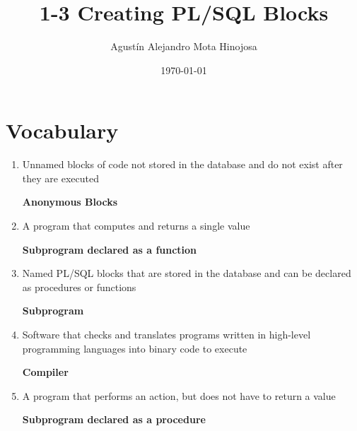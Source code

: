 \documentclass[11pt]{article}
\author{Agustín Alejandro Mota Hinojosa}
\date{\today}
\title{1-3 Creating PL/SQL Blocks}
\begin{document}
\maketitle
\tableofcontents

\section{Vocabulary}
\label{sec:orge6e193d}
\begin{enumerate}
\item Unnamed blocks of code not stored in the database and do not exist after
they are executed

\textbf{Anonymous Blocks}

\item A program that computes and returns a single value

\textbf{Subprogram declared as a function}

\item Named PL/SQL blocks that are stored in the database and can be declared as
procedures or functions

\textbf{Subprogram}

\item Software that checks and translates programs written in high-level
programming languages into binary code to execute

\textbf{Compiler}

\item A program that performs an action, but does not have to return a value

\textbf{Subprogram declared as a procedure}
\end{enumerate}
\end{document}
